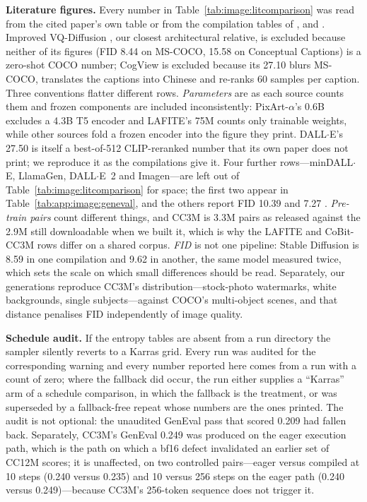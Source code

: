 \textbf{Literature figures.} Every number in Table~\ref{tab:image:litcomparison} was read from the
cited paper's own table or from the compilation tables of \citet{image:showo},
\citet{image:unidiffuser} and \citet{image:lafite}. Improved VQ-Diffusion
\citep{image:vqdiffusion-improved}, our closest architectural relative, is excluded because
neither of its figures (FID 8.44 on MS-COCO, 15.58 on Conceptual Captions) is a zero-shot COCO
number; CogView \citep{image:cogview} is excluded because its 27.10 blurs MS-COCO, translates the
captions into Chinese and re-ranks 60 samples per caption. Three conventions flatter different
rows. \emph{Parameters} are as each source counts them and frozen components are included
inconsistently: PixArt-$\alpha$'s 0.6B excludes a 4.3B T5 encoder and LAFITE's 75M counts only
trainable weights, while other sources fold a frozen encoder into the figure they print.
DALL$\cdot$E's 27.50 is itself a best-of-512 CLIP-reranked number that its own paper does not
print; we reproduce it as the compilations give it. Four further rows---minDALL$\cdot$E, LlamaGen,
DALL$\cdot$E~2 and Imagen---are left out of Table~\ref{tab:image:litcomparison} for space; the
first two appear in Table~\ref{tab:app:image:geneval}, and the others report FID 10.39
\citep{image:dalle2} and 7.27 \citep{image:imagen}.
\emph{Pre-train pairs} count different things, and CC3M is 3.3M pairs as released against the 2.9M
still downloadable when we built it, which is why the LAFITE and CoBit-CC3M rows differ on a
shared corpus. \emph{FID} is not one pipeline: Stable Diffusion is 8.59 in one compilation and
9.62 in another, the same model measured twice, which sets the scale on which small differences
should be read. Separately, our generations reproduce CC3M's distribution---stock-photo
watermarks, white backgrounds, single subjects---against COCO's multi-object scenes, and that
distance penalises FID independently of image quality.

\textbf{Schedule audit.} If the entropy tables are absent from a run directory the sampler
silently reverts to a Karras grid. Every run was audited for the corresponding warning and every
number reported here comes from a run with a count of zero; where the fallback did occur, the run
either supplies a ``Karras'' arm of a schedule comparison, in which the fallback is the treatment,
or was superseded by a fallback-free repeat whose numbers are the ones printed. The audit is not
optional: the unaudited GenEval pass that scored 0.209 had fallen back. Separately, CC3M's GenEval
0.249 was produced on the eager execution path, which is the path on which a bf16 defect
invalidated an earlier set of CC12M scores; it is unaffected, on two controlled pairs---eager
versus compiled at 10 steps (0.240 versus 0.235) and 10 versus 256 steps on the eager path (0.240
versus 0.249)---because CC3M's 256-token sequence does not trigger it.

